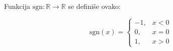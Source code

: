 \documentclass[11pt]{article}
\newcommand{\sgn}{\text{sgn}}
\newcommand{\R}{\mathbb{R}}
\begin{document}
	\noindent
	Funkcija $ \sgn \colon \R \rightarrow \R $ se defini\v se ovako:

	\begin{equation*}
		\sgn (x) = \begin{cases}
			-1, & x < 0 \\
			0, & x = 0 \\
			1, & x > 0
		\end{cases}
	\end{equation*}
\end{document}
